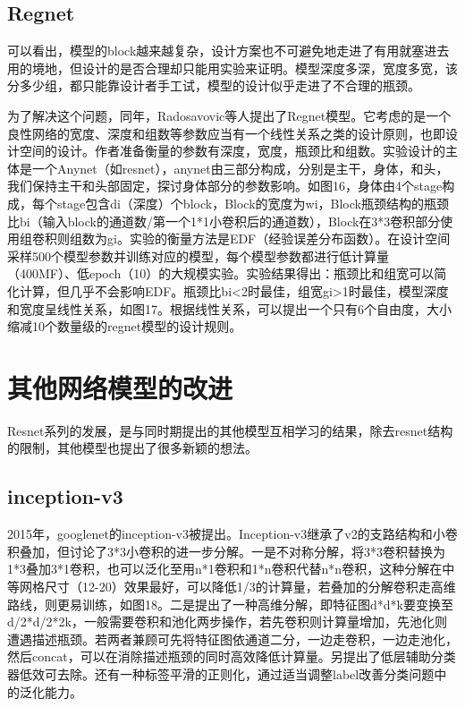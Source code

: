 \documentclass[15pt]{article}
\begin{document}
\subsection{Regnet}
可以看出，模型的block越来越复杂，设计方案也不可避免地走进了有用就塞进去用的境地，但设计的是否合理却只能用实验来证明。模型深度多深，宽度多宽，该分多少组，都只能靠设计者手工试，模型的设计似乎走进了不合理的瓶颈。

为了解决这个问题，同年，Radosavovic等人提出了Regnet模型\cite{ref73}。它考虑的是一个良性网络的宽度、深度和组数等参数应当有一个线性关系之类的设计原则，也即设计空间的设计。作者准备衡量的参数有深度，宽度，瓶颈比和组数。实验设计的主体是一个Anynet（如resnet），anynet由三部分构成，分别是主干，身体，和头，我们保持主干和头部固定，探讨身体部分的参数影响。如图16，身体由4个stage构成，每个stage包含di（深度）个block，Block的宽度为wi，Block瓶颈结构的瓶颈比bi（输入block的通道数/第一个1*1小卷积后的通道数），Block在3*3卷积部分使用组卷积则组数为gi。实验的衡量方法是EDF（经验误差分布函数）。在设计空间采样500个模型参数并训练对应的模型，每个模型参数都进行低计算量（400MF）、低epoch（10）的大规模实验。实验结果得出：瓶颈比和组宽可以简化计算，但几乎不会影响EDF。瓶颈比bi<2时最佳，组宽gi>1时最佳，模型深度和宽度呈线性关系，如图17。根据线性关系，可以提出一个只有6个自由度，大小缩减10个数量级的regnet模型的设计规则。

\section{其他网络模型的改进}
Resnet系列的发展，是与同时期提出的其他模型互相学习的结果，除去resnet结构的限制，其他模型也提出了很多新颖的想法。

\subsection{inception-v3}
2015年，googlenet的inception-v3被提出\cite{ref74}。Inception-v3继承了v2的支路结构和小卷积叠加，但讨论了3*3小卷积的进一步分解。一是不对称分解，将3*3卷积替换为1*3叠加3*1卷积，也可以泛化至用n*1卷积和1*n卷积代替n*n卷积，这种分解在中等网格尺寸（12-20）效果最好，可以降低1/3的计算量，若叠加的分解卷积走高维路线，则更易训练，如图18。二是提出了一种高维分解，即特征图d*d*k要变换至d/2*d/2*2k，一般需要卷积和池化两步操作，若先卷积则计算量增加，先池化则遭遇描述瓶颈。若两者兼顾可先将特征图依通道二分，一边走卷积，一边走池化，然后concat，可以在消除描述瓶颈的同时高效降低计算量。另提出了低层辅助分类器低效可去除。还有一种标签平滑的正则化，通过适当调整label改善分类问题中的泛化能力。
\end{document}
